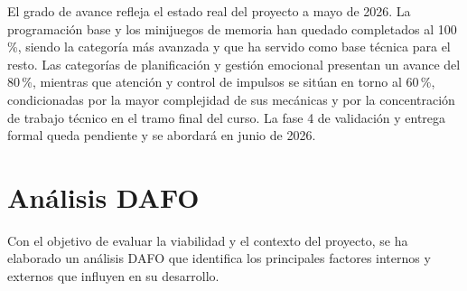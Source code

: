 \documentclass[12pt, a4paper]{report}
\begin{document}
El grado de avance refleja el estado real del proyecto a mayo de 2026. La
programación base y los minijuegos de memoria han quedado completados al
100\,\%, siendo la categoría más avanzada y que ha servido como base técnica
para el resto. Las categorías de planificación y gestión emocional presentan
un avance del 80\,\%, mientras que atención y control de impulsos se sitúan
en torno al 60\,\%, condicionadas por la mayor complejidad de sus mecánicas
y por la concentración de trabajo técnico en el tramo final del curso.
La fase 4 de validación y entrega formal queda pendiente y se abordará en
junio de 2026.

\clearpage
\section{Análisis DAFO}

Con el objetivo de evaluar la viabilidad y el contexto del proyecto, se ha
elaborado un análisis DAFO que identifica los principales factores internos
y externos que influyen en su desarrollo.
\end{document}
